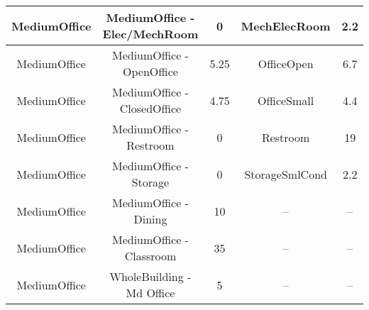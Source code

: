 \begin{table}
\begin{tabular}{|c|c|c|c|c|}
MediumOffice           & MediumOffice - Elec/MechRoom & 0                                                                                                             & MechElecRoom                      & 2.2                                                                                                            \\ \hline
MediumOffice           & MediumOffice - OpenOffice    & 5.25                                                                                                          & OfficeOpen                        & 6.7                                                                                                            \\ \hline
MediumOffice           & MediumOffice - ClosedOffice  & 4.75                                                                                                          & OfficeSmall                       & 4.4                                                                                                            \\ \hline
MediumOffice           & MediumOffice - Restroom      & 0                                                                                                             & Restroom                          & 19                                                                                                             \\ \hline
MediumOffice           & MediumOffice - Storage       & 0                                                                                                             & StorageSmlCond                    & 2.2                                                                                                            \\ \hline
MediumOffice           & MediumOffice - Dining        & 10                                                                                                            & --                                & --                                                                                                             \\ \hline
MediumOffice           & MediumOffice - Classroom     & 35                                                                                                            & --                                & --                                                                                                             \\ \hline
MediumOffice           & WholeBuilding - Md Office    & 5                                                                                                             & --                                & --                                                                                                             \\ \hline

\end{tabular}
\end{table}
